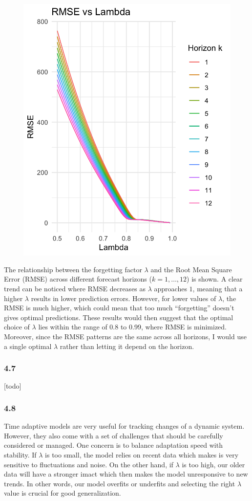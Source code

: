 \documentclass[
]{article}
\begin{document}
\begin{figure}

{\centering \includegraphics[width=0.5\linewidth]{plots/rmse_lambda} 

}

\end{figure}

The relationship between the forgetting factor \(\lambda\) and the Root
Mean Square Error (RMSE) across different forecast horizons
(\(k = 1, \dots, 12\)) is shown. A clear trend can be noticed where RMSE
decreases as \(\lambda\) approaches \(1\), meaning that a higher
\(\lambda\) results in lower prediction errors. However, for lower
values of \(\lambda\), the RMSE is much higher, which could mean that
too much ``forgetting'' doesn't gives optimal predictions. These results
would then suggest that the optimal choice of \(\lambda\) lies within
the range of 0.8 to 0.99, where RMSE is minimized. Moreover, since the
RMSE patterns are the same across all horizons, I would use a single
optimal \(\lambda\) rather than letting it depend on the horizon.

\subsubsection{4.7}\label{section-19}

{[}todo{]}

\subsubsection{4.8}\label{section-20}

Time adaptive models are very useful for tracking changes of a dynamic
system. However, they also come with a set of challenges that should be
carefully considered or managed. One concern is to balance adaptation
speed with stability. If \(\lambda\) is too small, the model relies on
recent data which makes is very sensitive to fluctuations and noise. On
the other hand, if \(\lambda\) is too high, our older data will have a
stronger imact which then makes the model unresponsive to new trends. In
other words, our model overfits or underfits and selecting the right
\(\lambda\) value is crucial for good generalization.
\end{document}
